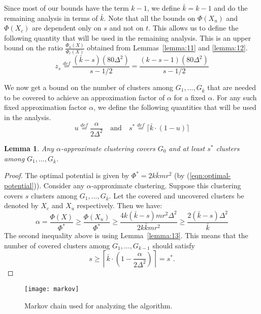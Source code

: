 \documentclass[11pt]{article}
\newtheorem{lemma}[theorem]{Lemma}
\begin{document}
Since most of our bounds have the term $k-1$, we define $\bar{k} = k-1$ and do the remaining analysis in terms of $\bar{k}$.
Note that all the bounds on $\Phi(X_u)$ and $\Phi(X_c)$ are dependent only on $s$ and not on $t$.
This allows us to define the following quantity that will be used in the remaining analysis. 
This is an upper bound on the ratio $\frac{\Phi_{u}(X)}{\Phi_{c}(X)}$ obtained from Lemmas~\ref{lemma:11} and \ref{lemma:12}.
\begin{equation}\label{eqn:z_s}
z_s \stackrel{def}{=} \frac{(\bar{k}-s)(80 \Delta^2)}{s-1/2} = \frac{(k-s-1)(80 \Delta^2)}{s-1/2}
\end{equation}

We now get a bound on the number of clusters among $G_1, ..., G_{\bar{k}}$ that are needed to be covered to achieve an approximation factor of $\alpha$ for a fixed $\alpha$.
For any such fixed approximation factor $\alpha$, we define the following quantities that will be used in the analysis.
\begin{equation}
u \stackrel{def}{=} \frac{\alpha}{2 \Delta^2} \quad \textrm{and} \quad 
s^* \stackrel{def}{=} \lceil \bar{k} \cdot (1 - u) \rceil
\end{equation}




\begin{lemma}
Any $\alpha$-approximate clustering covers $G_0$ and at least $s^*$ clusters among $G_1, ..., G_{\bar{k}}$.
\end{lemma}
\begin{proof}
The optimal potential is given by $\Phi^{*} = 2k \bar{k}m r^2$ (by (\ref{eqn:optimal-potential})).
Consider any $\alpha$-approximate clustering. 
Suppose this clustering covers $s$ clusters among $G_1, ..., G_{\bar{k}}$. 
Let the covered and uncovered clusters be denoted by $X_c$ and $X_u$ respectively.
Then we have:
\[
\alpha = \frac{\Phi(X)}{\Phi^{*}} \geq \frac{\Phi(X_u)}{\Phi^{*}} \geq \frac{4k (\bar{k}-s)m r^2 \Delta^2}{2k \bar{k} m r^2} \geq \frac{2 (\bar{k}-s) \Delta^2}{\bar{k}}
\]
The second inequality above is using Lemma~\ref{lemma:13}.
This means that the number of covered clusters among $G_1, ..., G_{k-1}$ should satisfy
\[
s \geq \left\lceil \bar{k} \cdot \left( 1 - \frac{\alpha}{2 \Delta^2} \right) \right\rceil = s^*.
\]
\end{proof}


\begin{figure}
\centering
\texttt{[image: markov]}
\caption{Markov chain used for analyzing the algorithm.}
\label{fig:2}
\end{figure}
\end{document}
